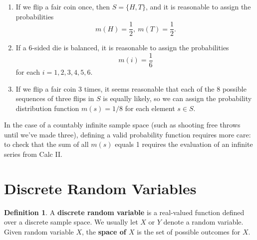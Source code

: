 \documentclass[
]{book}
\theoremstyle{definition}
\newtheorem{definition}{Definition}[chapter]
\theoremstyle{definition}
\theoremstyle{definition}
\theoremstyle{definition}
\theoremstyle{remark}
\begin{document}
\begin{enumerate}
\def\labelenumi{\arabic{enumi}.}
\item
  If we flip a fair coin once, then \(S = \{H,T\}\), and it is reasonable to assign the probabilities \[m(H) = \frac{1}{2}, ~ m(T) = \frac{1}{2}.\]
\item
  If a 6-sided die is balanced, it is reasonable to assign the probabilities \[m(i) = \frac{1}{6}\] for each \(i = 1, 2, 3, 4, 5, 6\).
\item
  If we flip a fair coin 3 times, it seems reasonable that each of the 8 possible sequences of three flips in \(S\) is equally likely, so we can assign the probability distribution function \(m(s) = 1/8\) for each element \(s \in S\).
\end{enumerate}

In the case of a countably infinite sample space (such as shooting free throws until we've made three), defining a valid probability function requires more care: to check that the sum of all \(m(s)\) equals 1 requires the evaluation of an infinite series from Calc II.

\section{Discrete Random Variables}\label{discrete-random-variables}

\begin{definition}
\protect\hypertarget{def:random-variable}{}\label{def:random-variable}A \textbf{discrete random variable} is a real-valued function defined over a discrete sample space. We usually let \(X\) or \(Y\) denote a random variable. Given random variable \(X\), the \textbf{space of \(X\)} is the set of possible outcomes for \(X\).
\end{definition}
\end{document}
